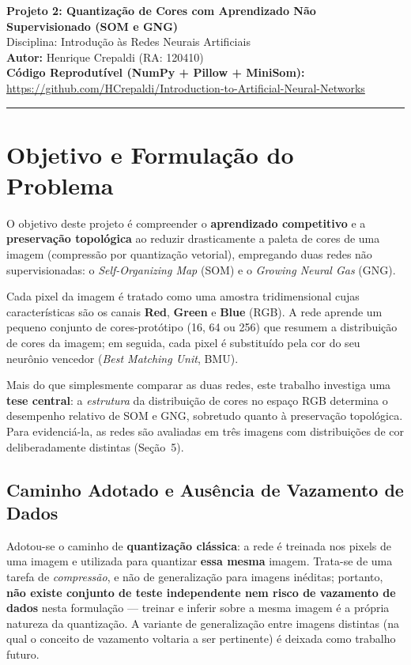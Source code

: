 \documentclass[11pt,a4paper]{article}
\begin{document}
\begin{center}
    {\LARGE \textbf{Projeto 2: Quantização de Cores com Aprendizado Não Supervisionado (SOM e GNG)}} \\[0.35em]
    {\large Disciplina: Introdução às Redes Neurais Artificiais} \\[0.3em]
    \textbf{Autor:} Henrique Crepaldi (RA: 120410) \\[0.2em]
    \textbf{Código Reprodutível (NumPy + Pillow + MiniSom):} \url{https://github.com/HCrepaldi/Introduction-to-Artificial-Neural-Networks}
\end{center}
\vspace{-0.5em}
\hrule
\vspace{0.8em}

\section{Objetivo e Formulação do Problema}

O objetivo deste projeto é compreender o \textbf{aprendizado competitivo} e a \textbf{preservação topológica} ao reduzir drasticamente a paleta de cores de uma imagem (compressão por quantização vetorial), empregando duas redes não supervisionadas: o \textit{Self-Organizing Map} (SOM) e o \textit{Growing Neural Gas} (GNG).

Cada pixel da imagem é tratado como uma amostra tridimensional cujas características são os canais \textbf{Red}, \textbf{Green} e \textbf{Blue} (RGB). A rede aprende um pequeno conjunto de cores-protótipo (16, 64 ou 256) que resumem a distribuição de cores da imagem; em seguida, cada pixel é substituído pela cor do seu neurônio vencedor (\textit{Best Matching Unit}, BMU).

Mais do que simplesmente comparar as duas redes, este trabalho investiga uma \textbf{tese central}: a \textit{estrutura} da distribuição de cores no espaço RGB determina o desempenho relativo de SOM e GNG, sobretudo quanto à preservação topológica. Para evidenciá-la, as redes são avaliadas em três imagens com distribuições de cor deliberadamente distintas (Seção~5).

\subsection{Caminho Adotado e Ausência de Vazamento de Dados}
Adotou-se o caminho de \textbf{quantização clássica}: a rede é treinada nos pixels de uma imagem e utilizada para quantizar \textbf{essa mesma} imagem. Trata-se de uma tarefa de \textit{compressão}, e não de generalização para imagens inéditas; portanto, \textbf{não existe conjunto de teste independente nem risco de vazamento de dados} nesta formulação --- treinar e inferir sobre a mesma imagem é a própria natureza da quantização. A variante de generalização entre imagens distintas (na qual o conceito de vazamento voltaria a ser pertinente) é deixada como trabalho futuro.
\end{document}
